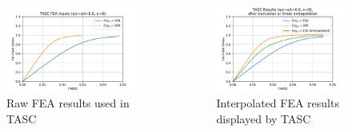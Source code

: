 \begin{frame}
\begin{columns}
\begin{column}{0.45\textwidth}
\begin{figure}[bp]
\centering
\includegraphics[width=\columnwidth]{tasc-inputs}
\caption{\label{fig:tasc_fea_inputs} Raw FEA results used in TASC}
\end{figure}
\end{column}
\begin{column}{0.45\textwidth}
\begin{figure}[tbp]
\centering
\includegraphics[width=\columnwidth]{tasc-results}
\caption{\label{fig:tasc_interp_outputs} Interpolated FEA results displayed by TASC}
\end{figure}
\end{column}
\end{columns}
\end{frame}

